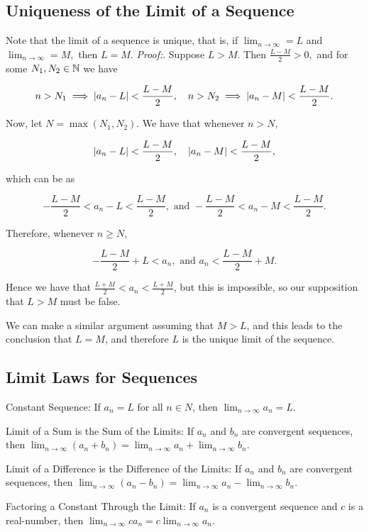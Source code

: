 \documentclass{article}
\begin{document}
\subsection{Uniqueness of the Limit of a Sequence}

Note that the limit of a sequence is unique, that is, if $\lim_{n \to \infty} = L$ and $\lim_{n \to \infty} = M,$ then $L = M$. \emph{Proof:}. Suppose $L > M$. Then $\frac{L - M}{2} > 0,$ and for some $N_1, N_2 \in \mathbb{N}$ we have

\[ n > N_1 \implies \left| a_n - L \right| < \frac{L - M}{2}, \quad n > N_2 \implies \left| a_n - M \right| < \frac{L - M}{2}. \]

Now, let $N = \max{(N_1, N_2)}.$ We have that whenever $n > N$,

\[ \left| a_n - L \right| < \frac{L - M}{2}, \quad \left| a_n - M \right| < \frac{L - M}{2}, \]

which can be  as

\[ - \frac{L - M}{2} < a_n - L < \frac{L - M}{2}, \text{ and }  - \frac{L - M}{2} < a_n - M < \frac{L - M}{2}. \]

Therefore, whenever $n \geq N$,

\[ - \frac{L - M}{2} + L < a_n, \text{ and } a_n < \frac{L - M}{2} + M. \]

Hence we have that $\frac{L+M}{2} < a_n < \frac{L+M}{2}$, but this is impossible, so our supposition that $L > M$ must be false.

We can make a similar argument assuming that $M > L$, and this leads to the conclusion that $L = M$, and therefore $L$ is the unique limit of the sequence.

\subsection{Limit Laws for Sequences}

Constant Sequence: If $a_n = L$ for all $n \in N$, then $\lim_{n \to \infty} a_n = L.$

Limit of a Sum is the Sum of the Limits: If $a_n$ and $b_n$ are \@{convergent} sequences, then $\lim_{n \to \infty}{(a_n + b_n)} = \lim_{n \to \infty}{a_n} + \lim_{n \to \infty}{b_n}$.

Limit of a Difference is the Difference of the Limits: If $a_n$ and $b_n$ are convergent sequences, then $\lim_{n \to \infty}{(a_n - b_n)} = \lim_{n \to \infty}{a_n} - \lim_{n \to \infty}{b_n}$.

Factoring a Constant Through the Limit: If $a_n$ is a convergent sequence and $c$ is a \@{real-number}, then $\lim_{n \to \infty} ca_n = c \lim_{n \to \infty} a_n.$
\end{document}
